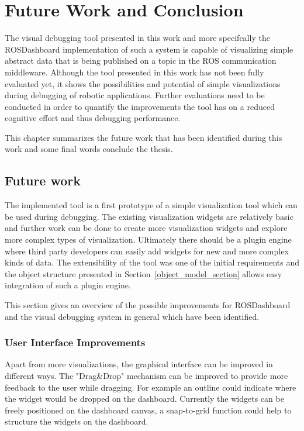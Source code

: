 \chapter{Future Work and Conclusion}
\label{future_work}

The visual debugging tool presented in this work and more specifcally the ROSDashboard implementation of such a system is capable of visualizing simple abstract data that is being published on a topic in the ROS communication middleware. Although the tool presented in this work has not been fully evaluated yet, it shows the possibilities and potential of simple visualizations during debugging of robotic applications. Further evaluations need to be conducted in order to quantify the improvements the tool has on a reduced cognitive effort and thus debugging performance.

This chapter summarizes the future work that has been identified during this work and some final words conclude the thesis.


\section{Future work}
The implemented tool is a first prototype of a simple visualization tool which can be used during debugging. The existing visualization widgets are relatively basic and further work can be done to create more visualization widgets and explore more complex types of visualization. Ultimately there should be a plugin engine where third party developers can easily add widgets for new and more complex kinds of data. The extensibility of the tool was one of the initial requirements and the object structure presented in Section~\ref{object_model_section} allows easy integration of such a plugin engine.

This section gives an overview of the possible improvements for ROSDashboard and the visual debugging system in general which have been identified.

\subsection{User Interface Improvements}
Apart from more visualizations, the graphical interface can be improved in different ways. The "Drag\&Drop" mechanism can be improved to provide more feedback to the user while dragging. For example an outline could indicate where the widget would be dropped on the dashboard. Currently the widgets can be freely positioned on the dashboard canvas, a snap-to-grid function could help to structure the widgets on the dashboard.

